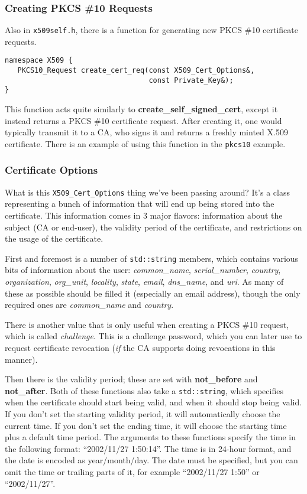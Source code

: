 \documentclass{article}
\newcommand{\filename}[1]{\texttt{#1}}
\newcommand{\function}[1]{\textbf{#1}}
\newcommand{\type}[1]{\texttt{#1}}
\renewcommand{\arg}[1]{\textsl{#1}}
\begin{document}
\subsubsection{Creating PKCS \#10 Requests}

Also in \filename{x509self.h}, there is a function for generating new PKCS \#10
certificate requests.

\begin{verbatim}
namespace X509 {
   PKCS10_Request create_cert_req(const X509_Cert_Options&,
                                  const Private_Key&);
}
\end{verbatim}

This function acts quite similarly to \function{create\_self\_signed\_cert},
except it instead returns a PKCS \#10 certificate request. After creating it,
one would typically transmit it to a CA, who signs it and returns a freshly
minted X.509 certificate. There is an example of using this function in the
\filename{pkcs10} example.

\subsubsection{Certificate Options}

What is this \type{X509\_Cert\_Options} thing we've been passing
around? It's a class representing a bunch of information that will end
up being stored into the certificate. This information comes in 3
major flavors: information about the subject (CA or end-user), the
validity period of the certificate, and restrictions on the usage of
the certificate.

First and foremost is a number of \type{std::string} members, which contains
various bits of information about the user: \arg{common\_name},
\arg{serial\_number}, \arg{country}, \arg{organization}, \arg{org\_unit},
\arg{locality}, \arg{state}, \arg{email}, \arg{dns\_name}, and \arg{uri}. As
many of these as possible should be filled it (especially an email address),
though the only required ones are \arg{common\_name} and \arg{country}.

There is another value that is only useful when creating a PKCS \#10 request,
which is called \arg{challenge}. This is a challenge password, which you can
later use to request certificate revocation (\emph{if} the CA supports doing
revocations in this manner).

Then there is the validity period; these are set with \function{not\_before}
and \function{not\_after}. Both of these functions also take a
\type{std::string}, which specifies when the certificate should start being
valid, and when it should stop being valid. If you don't set the starting
validity period, it will automatically choose the current time. If you don't
set the ending time, it will choose the starting time plus a default time
period. The arguments to these functions specify the time in the following
format: ``2002/11/27 1:50:14''. The time is in 24-hour format, and the date is
encoded as year/month/day. The date must be specified, but you can omit the
time or trailing parts of it, for example ``2002/11/27 1:50'' or
``2002/11/27''.
\end{document}
